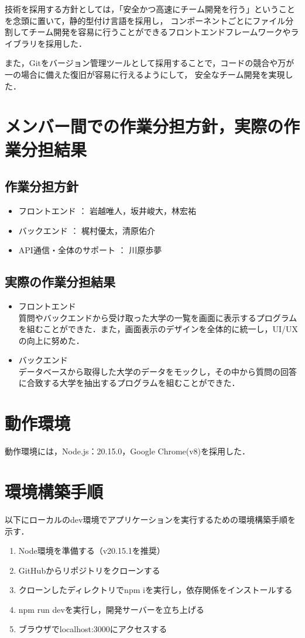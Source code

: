 \documentclass[a4j, titlepage]{jarticle}
\begin{document}
技術を採用する方針としては，「安全かつ高速にチーム開発を行う」ということを念頭に置いて，静的型付け言語を採用し，
コンポーネントごとにファイル分割してチーム開発を容易に行うことができるフロントエンドフレームワークやライブラリを採用した．

また，Gitをバージョン管理ツールとして採用することで，コードの競合や万が一の場合に備えた復旧が容易に行えるようにして，
安全なチーム開発を実現した．

\section{メンバー間での作業分担方針，実際の作業分担結果}

\subsection{作業分担方針}
\begin{itemize}
\item フロントエンド ： 岩越唯人，坂井峻大，林宏祐
\item バックエンド ： 梶村優太，清原佑介
\item API通信・全体のサポート ： 川原歩夢
\end{itemize}

\subsection{実際の作業分担結果}
\begin{itemize}
\item{フロントエンド} \\
質問やバックエンドから受け取った大学の一覧を画面に表示するプログラムを組むことができた．また，画面表示のデザインを全体的に統一し，UI/UXの向上に努めた．
\item{バックエンド} \\
データベースから取得した大学のデータをモックし，その中から質問の回答に合致する大学を抽出するプログラムを組むことができた．
\end{itemize}

\section{動作環境}
動作環境には，Node.js：20.15.0，Google Chrome(v8)を採用した．
\section{環境構築手順}
以下にローカルのdev環境でアプリケーションを実行するための環境構築手順を示す．
\begin{enumerate}
\item Node環境を準備する（v20.15.1を推奨）
\item GitHubからリポジトリをクローンする
\item クローンしたディレクトリでnpm iを実行し，依存関係をインストールする
\item npm run devを実行し，開発サーバーを立ち上げる
\item ブラウザでlocalhost:3000にアクセスする
\end{enumerate}
\end{document}
